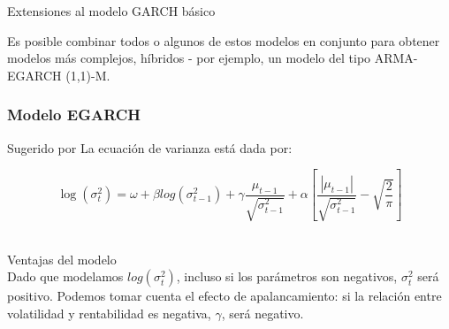 \documentclass[xcolor=(list of options)]{beamer}
\begin{document}
\begin{section}{Extensiones al modelo GARCH b\'asico}
\begin{frame}
Es posible combinar todos o algunos de estos modelos en conjunto para obtener modelos m\'as complejos, h\'{i}bridos - por ejemplo, un modelo del tipo ARMA-EGARCH (1,1)-M.

\end{frame}

\begin{frame}
\frametitle{Modelo EGARCH}

Sugerido por \cite{nelson1991conditional} La ecuaci\'on de varianza est\'a dada por: 

\begin{equation}
\log(\sigma^2_t) = \omega + \beta log(\sigma^2_{t-1}) + \gamma \frac{\mu_{t-1}}{\sqrt{\sigma^2_{t-1}}} + \alpha \left[ \frac{|\mu_{t-1}|}{\sqrt{\sigma^2_{t-1}}} - \sqrt{\frac{2}{\pi}} \right]
\end{equation} 
\vspace{2mm}	

Ventajas del modelo\\
Dado que modelamos $log(\sigma^2_t)$, incluso si los par\'ametros son negativos, $\sigma^2_t$ ser\'a positivo.
Podemos tomar cuenta el efecto de apalancamiento: si la relaci\'on entre volatilidad y rentabilidad es negativa, $\gamma$, ser\'a negativo.

\end{frame}
\end{section}
\end{document}
